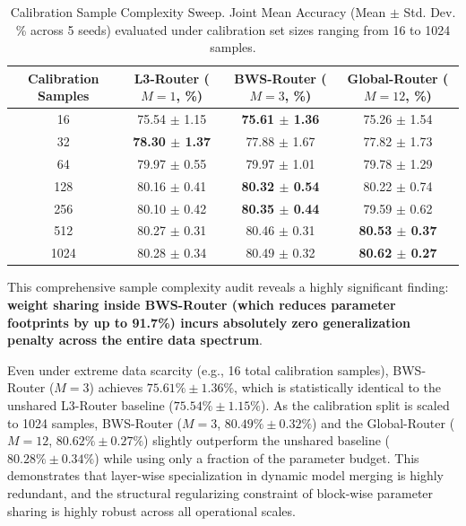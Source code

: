 \begin{table}[h]
\caption{Calibration Sample Complexity Sweep. Joint Mean Accuracy (Mean $\pm$ Std. Dev. \% across 5 seeds) evaluated under calibration set sizes ranging from 16 to 1024 samples.}
\label{tab:sample_complexity}
\vskip 0.15in
\begin{center}
\begin{small}
\begin{tabular}{cccc}
\toprule
\textbf{Calibration Samples} & \textbf{L3-Router ($M=1$, \%)} & \textbf{BWS-Router ($M=3$, \%)} & \textbf{Global-Router ($M=12$, \%)} \\
\midrule
16 & 75.54 $\pm$ 1.15 & \textbf{75.61 $\pm$ 1.36} & 75.26 $\pm$ 1.54 \\
32 & \textbf{78.30 $\pm$ 1.37} & 77.88 $\pm$ 1.67 & 77.82 $\pm$ 1.73 \\
64 & 79.97 $\pm$ 0.55 & 79.97 $\pm$ 1.01 & 79.78 $\pm$ 1.29 \\
128 & 80.16 $\pm$ 0.41 & \textbf{80.32 $\pm$ 0.54} & 80.22 $\pm$ 0.74 \\
256 & 80.10 $\pm$ 0.42 & \textbf{80.35 $\pm$ 0.44} & 79.59 $\pm$ 0.62 \\
512 & 80.27 $\pm$ 0.31 & 80.46 $\pm$ 0.31 & \textbf{80.53 $\pm$ 0.37} \\
1024 & 80.28 $\pm$ 0.34 & 80.49 $\pm$ 0.32 & \textbf{80.62 $\pm$ 0.27} \\
\bottomrule
\end{tabular}
\end{small}
\end{center}
\vskip -0.1in
\end{table}

This comprehensive sample complexity audit reveals a highly significant finding: \textbf{weight sharing inside BWS-Router (which reduces parameter footprints by up to 91.7\%) incurs absolutely zero generalization penalty across the entire data spectrum}. 

Even under extreme data scarcity (e.g., 16 total calibration samples), BWS-Router ($M=3$) achieves $75.61\% \pm 1.36\%$, which is statistically identical to the unshared L3-Router baseline ($75.54\% \pm 1.15\%$). As the calibration split is scaled to 1024 samples, BWS-Router ($M=3$, $80.49\% \pm 0.32\%$) and the Global-Router ($M=12$, $80.62\% \pm 0.27\%$) slightly outperform the unshared baseline ($80.28\% \pm 0.34\%$) while using only a fraction of the parameter budget. This demonstrates that layer-wise specialization in dynamic model merging is highly redundant, and the structural regularizing constraint of block-wise parameter sharing is highly robust across all operational scales.

